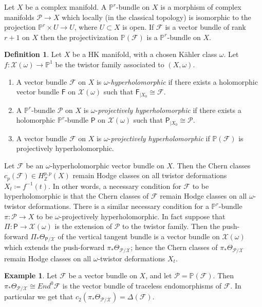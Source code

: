 \documentclass[11pt]{amsart}
\newcommand{\PP}{{\mathbb P}}
\newcommand{\ZZ}{{\mathbb Z}}
\let\mathcal\mathscr
\def\cF{\mathcal{F}}
\def\cP{\mathcal{P}}
\def\cX{\mathcal{X}}
\def\sF{{\mathsf F}}
\def\sP{{\mathsf P}}
\theoremstyle{definition}
\newtheorem{dfn}[lmm]{Definition}
\newtheorem{expl}[lmm]{Example}
\theoremstyle{remark}
\begin{document}
Let $X$ be a complex manifold. 
A  $\PP^r$-bundle on $X$ is a morphism of complex manifolds $\cP\to X$ which locally (in the classical topology)  is isomorphic to the projection $\PP^r\times U\to U$, where $U\subset X$ is open. If $\cF$ is a vector bundle of rank $r+1$ on $X$ then the projectivization $\PP(\cF)$ is a  $\PP^r$-bundle on $X$. 
%
\begin{dfn}
%
Let $X$ be a HK manifold,  with a chosen  K\"ahler class $\omega$. Let $f\colon\cX(\omega)\to\PP^1$ be the twistor family associated to $(X,\omega)$. 
%
\begin{enumerate}
%
\item
%
A  vector bundle $\cF$ on $X$ is $\omega$-\emph{hyperholomorphic} if there exists a holomorphic vector bundle $\sF$ on $\cX(\omega)$ such that $\sF_{|X_0}\cong\cF$.
%
\item
%
A  $\PP^r$-bundle $\cP$ on $X$ is $\omega$-\emph{projectively hyperholomorphic} if there exists a holomorphic $\PP^r$-bundle $\sP$ on 
$\cX(\omega)$ such that $\sP_{|X_0}\cong\cP$.
%
\item
%
A  vector bundle $\cF$ on $X$ is $\omega$-\emph{projectively hyperholomorphic} if $\PP(\cF)$ is projectively hyperholomorphic.
%
\end{enumerate}
%
\end{dfn}
%
Let $\cF$ be an $\omega$-hyperholomorphic vector bundle  on $X$.  Then the Chern classes $c_p(\cF)\in H^{p,p}_{\ZZ}(X)$ remain  Hodge classes on all twistor deformations $X_t\coloneqq f^{-1}(t)$. In other words, a necessary condition for $\cF$ to be  hyperholomorphic is that the Chern classes of $\cF$ remain Hodge classes on all $\omega$-twistor deformations. There is a similar necessary condition for a $\PP^r$-bundle  $\pi\colon \cP\to X$ to be  $\omega$-projectively hyperholomorphic. In fact suppose that $\Pi\colon \sP\to\cX(\omega)$ is the extension of $\cP$ to the twistor family. Then  the push-forward 
$\Pi_{*}\Theta_{\sP/\cX}$ of the vertical tangent bundle  is a vector bundle on $\cX(\omega)$ which extends  the push-forward  
$\pi_{*}\Theta_{\cP/\cX}$; hence the Chern classes of $\pi_{*}\Theta_{\cP/\cX}$ remain Hodge classes on all $\omega$-twistor deformations $X_t$. 
\begin{expl}\label{expl:discetang}
%
Let  $\cF$ be a vector bundle on $X$, and let $\cP=\PP(\cF)$. Then $\pi_{*}\Theta_{\cP/\cX}\cong End^0\cF$ is the vector bundle of traceless endomorphisms of $\cF$. In particular we get that $c_2(\pi_{*}\Theta_{\cP/\cX})=\Delta(\cF)$. 
%
\end{expl}
\end{document}
